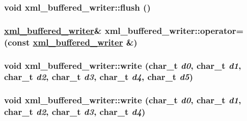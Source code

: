 \hypertarget{classxml__buffered__writer_74192d6bbee5ea387377537ede483b4f}{
\subsubsection[flush]{\setlength{\rightskip}{0pt plus 5cm}void xml\_\-buffered\_\-writer::flush ()}}
\label{classxml__buffered__writer_74192d6bbee5ea387377537ede483b4f}


\hypertarget{classxml__buffered__writer_0aab8cdf0db6269840a0b16319bdb985}{
\subsubsection[operator=]{\setlength{\rightskip}{0pt plus 5cm}\hyperlink{classxml__buffered__writer}{xml\_\-buffered\_\-writer}\& xml\_\-buffered\_\-writer::operator= (const \hyperlink{classxml__buffered__writer}{xml\_\-buffered\_\-writer} \&)}}
\label{classxml__buffered__writer_0aab8cdf0db6269840a0b16319bdb985}


\hypertarget{classxml__buffered__writer_e6af5067d768c24b9c20422f76737f29}{
\subsubsection[write]{\setlength{\rightskip}{0pt plus 5cm}void xml\_\-buffered\_\-writer::write (char\_\-t {\em d0}, char\_\-t {\em d1}, char\_\-t {\em d2}, char\_\-t {\em d3}, char\_\-t {\em d4}, char\_\-t {\em d5})}}
\label{classxml__buffered__writer_e6af5067d768c24b9c20422f76737f29}


\hypertarget{classxml__buffered__writer_ad4a4f18223ec3cb1ff607425119b85f}{
\subsubsection[write]{\setlength{\rightskip}{0pt plus 5cm}void xml\_\-buffered\_\-writer::write (char\_\-t {\em d0}, char\_\-t {\em d1}, char\_\-t {\em d2}, char\_\-t {\em d3}, char\_\-t {\em d4})}}
\label{classxml__buffered__writer_ad4a4f18223ec3cb1ff607425119b85f}



